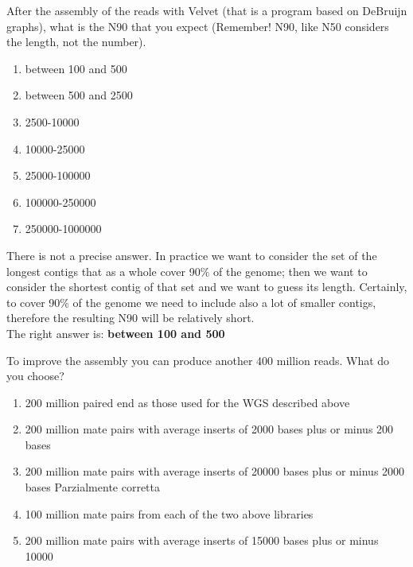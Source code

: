 \begin{Exercise} [
  label={ex37},
  origin={G. Valle}
 ]

\Question After the assembly of the reads with Velvet (that is a program based
on DeBruijn graphs), what is the N90 that you expect (Remember!  N90, like N50
considers the length, not the number).
\begin{enumerate}
\item between 100 and 500
\item between 500 and 2500
\item 2500-10000
\item 10000-25000
\item 25000-100000
\item 100000-250000
\item 250000-1000000 
\end{enumerate}


\end{Exercise}

\begin{Answer} [
  ref={ex37},
  number={1}
 ]

\Question There is not a precise answer.  In practice we want to consider the
set of  the longest contigs that as a whole cover 90\% of the genome; then we
want to consider the shortest contig of that set and we want to guess its
length. Certainly, to cover 90\% of the genome we need to include also a lot of
smaller contigs, therefore the resulting N90 will be relatively short.\\
The right answer is: \textbf{between 100 and 500}

\end{Answer}

\begin{Exercise} [
  label={ex38},
  origin={G. Valle}
 ]

\Question To improve the assembly you can produce another 400 million reads.
What do you choose?
\begin{enumerate}
\item 200 million paired end as those used for the WGS described above
\item 200 million mate pairs with average inserts of 2000 bases plus or minus
200 bases
\item 200 million mate pairs with average inserts of 20000 bases plus or minus
2000 bases Parzialmente corretta
\item 100 million mate pairs from each of the two above libraries
\item 200 million mate pairs with average inserts of 15000 bases plus or minus
10000
\end{enumerate}

\end{Exercise}

